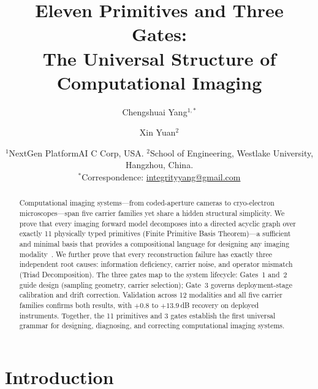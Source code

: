 



\title{Eleven Primitives and Three Gates:\\
The Universal Structure of Computational Imaging}

\author{
Chengshuai Yang$^{1,*}$
\and
Xin Yuan$^{2}$
}

\date{%
$^1$NextGen PlatformAI C Corp, USA.\quad
$^2$School of Engineering, Westlake University, Hangzhou, China.\\[2pt]
$^*$Correspondence: \url{integrityyang@gmail.com}%
}

\maketitle

\begin{abstract}
Computational imaging systems---from coded-aperture cameras to cryo-electron microscopes---span five carrier families yet share a hidden structural simplicity. We prove that every imaging forward model decomposes into a directed acyclic graph over exactly 11 physically typed primitives (Finite Primitive Basis Theorem)---a sufficient and minimal basis that provides a compositional language for designing any imaging modality~\cite{yang2026fpt}. We further prove that every reconstruction failure has exactly three independent root causes: information deficiency, carrier noise, and operator mismatch (Triad Decomposition). The three gates map to the system lifecycle: Gates~1 and~2 guide design (sampling geometry, carrier selection); Gate~3 governs deployment-stage calibration and drift correction. Validation across 12 modalities and all five carrier families confirms both results, with $+0.8$ to $+13.9$\,dB recovery on deployed instruments. Together, the 11 primitives and 3 gates establish the first universal grammar for designing, diagnosing, and correcting computational imaging systems.
\end{abstract}

\section*{Introduction}

